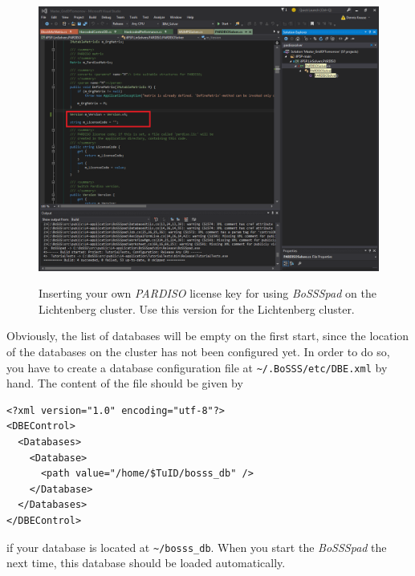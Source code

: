 \documentclass[11pt,twoside,a4paper]{fdyartcl}
\begin{document}
\begin{figure}[htbp] %
	\begin{centering}
		\includegraphics[width=\textwidth]{Figures/bossspad_pardiso.png}\\
	\end{centering}
	\caption{Inserting your own \emph{PARDISO} license key for using \emph{BoSSSpad} on the Lichtenberg cluster. Use this version for the Lichtenberg cluster.}\label{fig:pardiso_bossspad}
\end{figure} %


Obviously, the list of databases will be empty on the first start, since the location of the databases on the cluster has not been configured yet. In order to do so, you have to create a database configuration file at \verb|~/.BoSSS/etc/DBE.xml| by hand. The content of the file should be given by

\begin{minipage}{\linewidth}
\begin{lstlisting}
<?xml version="1.0" encoding="utf-8"?>
<DBEControl>
  <Databases>
    <Database>
      <path value="/home/$TuID/bosss_db" />
    </Database>
  </Databases>
</DBEControl>
\end{lstlisting}
\end{minipage}

if your database is located at \verb|~/bosss_db|. When you start the \emph{BoSSSpad} the next time, this database should be loaded automatically.
\end{document}
